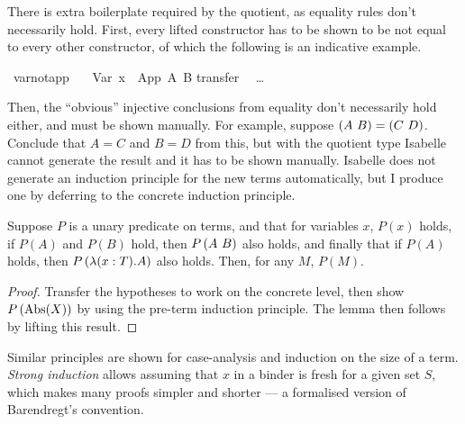 There is extra boilerplate required by the quotient, as equality rules don't necessarily hold.
First, every lifted constructor has to be shown to be not equal to every other constructor, of which the following is an indicative example.

\begin{implementation}
\isamarkupfalse%
\ var{\isacharunderscore}not{\isacharunderscore}app{\isacharcolon}\isanewline
\ \ \ {\isachardoublequoteopen}Var\ x\ {\isasymnoteq}\ App\ A\ B{\isachardoublequoteclose}\isanewline
%
\isadelimproof
%
\endisadelimproof
%
\isatagproof
{}\isamarkupfalse%
{\isacharparenleft}transfer{\isacharparenright}\isanewline
\ \ \ldots\isanewline
{}\isamarkupfalse%
%
\endisatagproof
\end{implementation}

Then, the ``obvious'' injective conclusions from equality don't necessarily hold either, and must be shown manually.
For example, suppose \(\left(A\ B\right) = \left(C\ D\right)\).
Conclude that \(A = C\) and \(B = D\) from this, but with the quotient type Isabelle cannot generate the result and it has to be shown manually.
Isabelle does not generate an induction principle for the new terms automatically, but I produce one by deferring to the concrete induction principle.

\begin{lemma}
Suppose \(P\) is a unary predicate on terms, and that for variables \(x\), \(P(x)\) holds, if \(P(A)\) and \(P(B)\) hold, then \(P\left(A\ B\right)\) also holds, and finally that if \(P(A)\) holds, then \(P\left(\lambda (x:T). A\right)\) also holds.
Then, for any \(M\), \(P(M)\).
\end{lemma}
\begin{proof}
Transfer the hypotheses to work on the concrete level, then show \(P\left(\textrm{Abs}(X)\right)\) by using the pre-term induction principle.
The lemma then follows by lifting this result.
\end{proof}

Similar principles are shown for case-analysis and induction on the size of a term.
\emph{Strong induction} allows assuming that \(x\) in a binder is fresh for a given set \(S\), which makes many proofs simpler and shorter --- a formalised version of Barendregt's convention.

